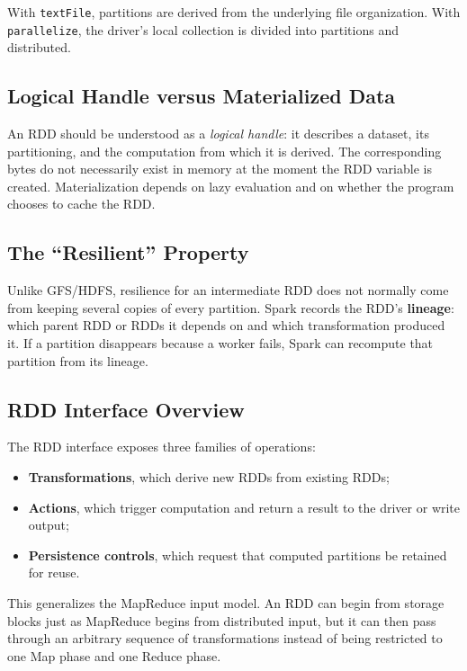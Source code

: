 \documentclass[11pt,a4paper,oneside]{book}
\begin{document}
With \texttt{textFile}, partitions are derived from the underlying file organization. With \texttt{parallelize}, the driver's local collection is divided into partitions and distributed.

\subsection{Logical Handle versus Materialized Data}

An RDD should be understood as a \emph{logical handle}: it describes a dataset, its partitioning, and the computation from which it is derived. The corresponding bytes do not necessarily exist in memory at the moment the RDD variable is created. Materialization depends on lazy evaluation and on whether the program chooses to cache the RDD.

\subsection{The ``Resilient'' Property}

Unlike GFS/HDFS, resilience for an intermediate RDD does not normally come from keeping several copies of every partition. Spark records the RDD's \textbf{lineage}: which parent RDD or RDDs it depends on and which transformation produced it. If a partition disappears because a worker fails, Spark can recompute that partition from its lineage.

\subsection{RDD Interface Overview}

The RDD interface exposes three families of operations:

\begin{itemize}
    \item \textbf{Transformations}, which derive new RDDs from existing RDDs;
    \item \textbf{Actions}, which trigger computation and return a result to the driver or write output;
    \item \textbf{Persistence controls}, which request that computed partitions be retained for reuse.
\end{itemize}

This generalizes the MapReduce input model. An RDD can begin from storage blocks just as MapReduce begins from distributed input, but it can then pass through an arbitrary sequence of transformations instead of being restricted to one Map phase and one Reduce phase.
\end{document}
